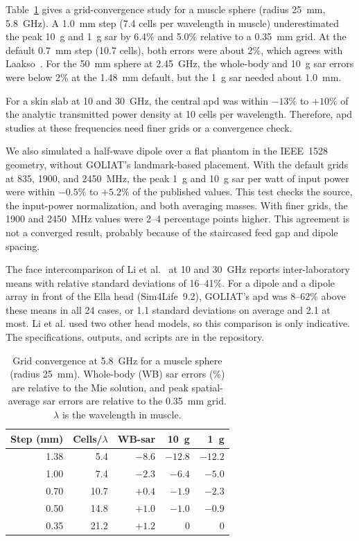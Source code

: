 \documentclass[final,5p,times,twocolumn]{elsarticle}
\begin{document}
Table~\ref{tab:convergence} gives a grid-convergence study for a muscle sphere (radius 25~mm, 5.8~GHz). A 1.0~mm step (7.4 cells per wavelength in muscle) underestimated the peak 10~g and 1~g \gls{sar} by 6.4\% and 5.0\% relative to a 0.35~mm grid. At the default 0.7~mm step (10.7 cells), both errors were about 2\%, which agrees with Laakso~\cite{Laakso2009}. For the 50~mm sphere at 2.45~GHz, the whole-body and 10~g \gls{sar} errors were below 2\% at the 1.48~mm default, but the 1~g \gls{sar} needed about 1.0~mm.

For a skin slab at 10 and 30~GHz, the central \gls{apd} was within $-13\%$ to $+10\%$ of the analytic transmitted power density at 10 cells per wavelength. Therefore, \gls{apd} studies at these frequencies need finer grids or a convergence check.

We also simulated a half-wave dipole over a flat phantom in the IEEE~1528 geometry, without GOLIAT's landmark-based placement. With the default grids at 835, 1900, and 2450~MHz, the peak 1~g and 10~g \gls{sar} per watt of input power were within $-0.5\%$ to $+5.2\%$ of the published values. This test checks the source, the input-power normalization, and both averaging masses. With finer grids, the 1900 and 2450~MHz values were 2--4 percentage points higher. This agreement is not a converged result, probably because of the staircased feed gap and dipole spacing.

The face intercomparison of Li et al.~\cite{Li2026} at 10 and 30~GHz reports inter-laboratory means with relative standard deviations of 16--41\%. For a dipole and a dipole array in front of the Ella head (Sim4Life~9.2), GOLIAT's \gls{apd} was 8--62\% above these means in all 24 cases, or 1.1 standard deviations on average and 2.1 at most. Li et al. used two other head models, so this comparison is only indicative. The specifications, outputs, and scripts are in the repository.

\begin{table}[!ht]
\centering
\small
\begin{tabular}{@{}rrrrr@{}}
\toprule
Step (mm) & Cells/$\lambda$ & WB-\gls{sar} & 10~g & 1~g \\
\midrule
1.38 & 5.4 & $-8.6$ & $-12.8$ & $-12.2$ \\
1.00 & 7.4 & $-2.3$ & $-6.4$ & $-5.0$ \\
0.70 & 10.7 & $+0.4$ & $-1.9$ & $-2.3$ \\
0.50 & 14.8 & $+1.0$ & $-1.0$ & $-0.9$ \\
0.35 & 21.2 & $+1.2$ & 0 & 0 \\
\bottomrule
\end{tabular}
\caption{Grid convergence at 5.8~GHz for a muscle sphere (radius 25~mm). Whole-body (WB) \gls{sar} errors (\%) are relative to the Mie solution, and peak spatial-average \gls{sar} errors are relative to the 0.35~mm grid. $\lambda$ is the wavelength in muscle.}
\label{tab:convergence}
\end{table}
\end{document}
